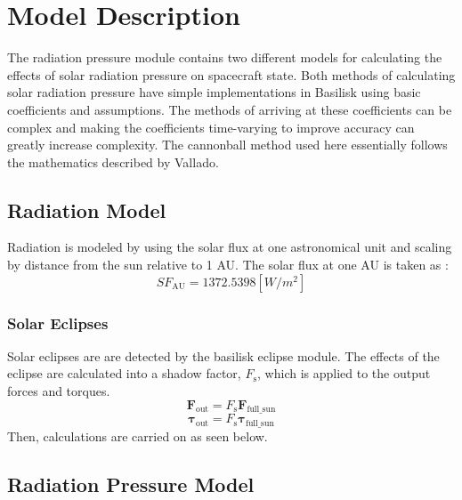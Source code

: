 \section{Model Description}
The radiation pressure module contains two different models for calculating the effects of solar radiation pressure on spacecraft state. Both methods of calculating solar radiation pressure have simple implementations in Basilisk using basic coefficients and assumptions. The methods of arriving at these coefficients can be complex and making the coefficients time-varying to improve accuracy can greatly increase complexity. The cannonball method used here essentially follows the mathematics described by Vallado\cite{vallado2001}.
\subsection{Radiation Model}
Radiation is modeled by using the solar flux at one astronomical unit and scaling by distance from the sun relative to 1 AU. The solar flux at one AU is taken as :
\begin{equation}
	SF_{\mathrm{AU}} = 1372.5398    [W/m^2]
\end{equation}
\subsubsection{Solar Eclipses}
Solar eclipses are are detected by the basilisk eclipse module. The effects of the eclipse are calculated into a shadow factor, $F_{\mathrm{s}}$, which is applied to the output forces and torques. 
\begin{equation}
	\mathbf{F}_{\mathrm{out}} = F_{\mathrm{s}}\mathbf{F}_{\mathrm{full\_sun}}
\end{equation}
\begin{equation}
\bm{\tau}_{\mathrm{out}} = F_{\mathrm{s}}\bm{\tau}_{\mathrm{full\_sun}}
\end{equation}
Then, calculations are carried on as seen below.

\subsection{Radiation Pressure Model}
